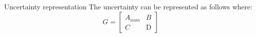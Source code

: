 
\begin{frame}{Uncertainty representation}
	The uncertainty can be represented as follows where:
	\begin{equation*}
		G = \left\lbrack \begin{array}{cc}
			A_{nom} & B\\
			C & \textrm{D}
		\end{array}\right\rbrack
	\end{equation*}
	
	\begin{figure}[h!]
		\centering
		\resizebox{\columnwidth}{!}{
			}
		\label{fig:tikzControlStrat}
	\end{figure}
\end{frame}

